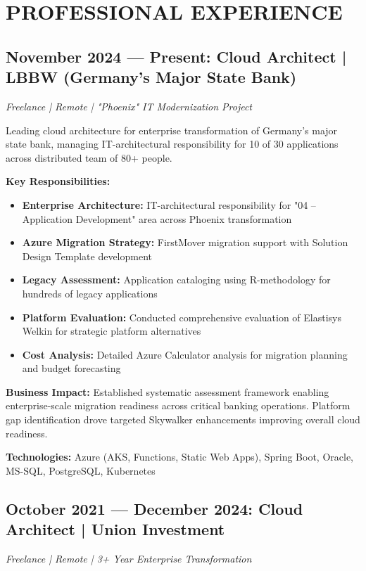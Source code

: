 \documentclass[10pt,a4paper]{article}
\begin{document}
\newpage

\section{PROFESSIONAL EXPERIENCE}

\subsection{November 2024 — Present: Cloud Architect | LBBW (Germany's Major State Bank)}
\textit{Freelance | Remote | "Phoenix" IT Modernization Project}

Leading cloud architecture for enterprise transformation of Germany's major state bank, managing IT-architectural responsibility for 10 of 30 applications across distributed team of 80+ people.

\textbf{Key Responsibilities:}
\begin{itemize}
    \item \textbf{Enterprise Architecture:} IT-architectural responsibility for "04 – Application Development" area across Phoenix transformation
    \item \textbf{Azure Migration Strategy:} FirstMover migration support with Solution Design Template development
    \item \textbf{Legacy Assessment:} Application cataloging using R-methodology for hundreds of legacy applications
    \item \textbf{Platform Evaluation:} Conducted comprehensive evaluation of Elastisys Welkin for strategic platform alternatives
    \item \textbf{Cost Analysis:} Detailed Azure Calculator analysis for migration planning and budget forecasting
\end{itemize}

\textbf{Business Impact:} Established systematic assessment framework enabling enterprise-scale migration readiness across critical banking operations. Platform gap identification drove targeted Skywalker enhancements improving overall cloud readiness.

\textbf{Technologies:} Azure (AKS, Functions, Static Web Apps), Spring Boot, Oracle, MS-SQL, PostgreSQL, Kubernetes

\vspace{6pt}

\subsection{October 2021 — December 2024: Cloud Architect | Union Investment}
\textit{Freelance | Remote | 3+ Year Enterprise Transformation}
\end{document}
